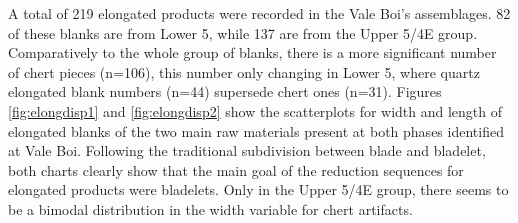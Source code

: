 \documentclass[12pt,twoside]{reedthesis}
\begin{document}
A total of 219 elongated products were recorded in the Vale Boi's assemblages. 82 of these blanks are from Lower 5, while 137 are from the Upper 5/4E group. Comparatively to the whole group of blanks, there is a more significant number of chert pieces (n=106), this number only changing in Lower 5, where quartz elongated blank numbers (n=44) supersede chert ones (n=31). Figures \ref{fig:elongdisp1} and \ref{fig:elongdisp2} show the scatterplots for width and length of elongated blanks of the two main raw materials present at both phases identified at Vale Boi. Following the traditional subdivision between blade and bladelet, both charts clearly show that the main goal of the reduction sequences for elongated products were bladelets. Only in the Upper 5/4E group, there seems to be a bimodal distribution in the width variable for chert artifacts.
\end{document}
